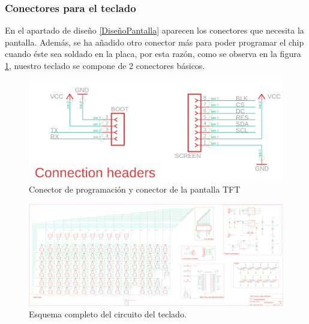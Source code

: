 \subsubsection{Conectores para el teclado}
En el apartado de diseño \ref{DiseñoPantalla} aparecen los conectores que necesita la pantalla. Además, se ha añadido otro conector más para poder programar el chip cuando éste sea soldado en la placa, por esta razón, como se observa en la figura \ref{fig:CircuitoConectores}, nuestro teclado se compone de 2 conectores básicos.

\begin{figure}[H]
    \centering
    \includegraphics[width=1.0\textwidth]{imagenes/Capitulos/Cap04/Conectores.png}
    \caption{Conector de programación y conector de la pantalla \gls{TFT} \cite{Repo:ImagenCircuito}}
    \label{fig:CircuitoConectores}
\end{figure}

\begin{figure}
\centering
\includegraphics[width=\textheight]{imagenes/Capitulos/Cap04/Esquematico.png}
\caption{Esquema completo del circuito del teclado. \cite{Repo:ImagenCircuito}}
\label{fig:CircuitoCompleto}
\end{figure}